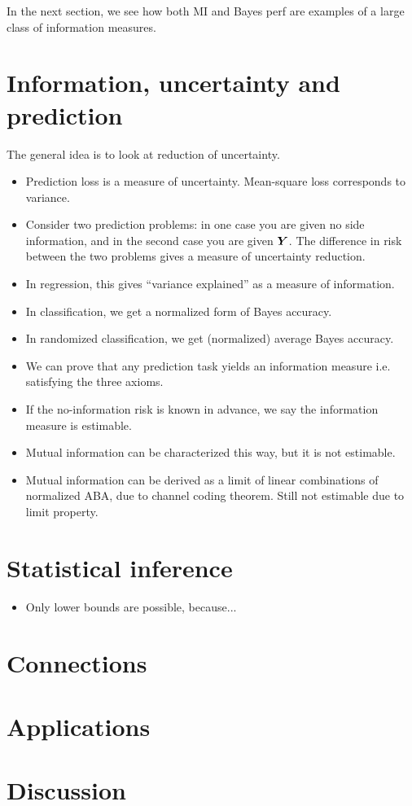 \documentclass[12pt]{article}
\begin{document}
In the next section, we see how both MI and Bayes perf are examples of
a large class of information measures.

\section{Information, uncertainty and prediction}\label{sec:gen_class}

The general idea is to look at reduction of uncertainty.

\begin{itemize}
\item 
Prediction loss is a measure of uncertainty.  Mean-square loss
corresponds to variance.
\item 
Consider two prediction problems: in one case you are given no side
information, and in the second case you are given $\boldsymbol{Y}$.  The
difference in risk between the two problems gives a measure of
uncertainty reduction.
\item
In regression, this gives ``variance explained'' as a measure of
information.
\item
In classification, we get a normalized form of Bayes accuracy.
\item
In randomized classification, we get (normalized) average Bayes accuracy.
\item
We can prove that any prediction task yields an information measure
i.e. satisfying the three axioms.
\item
If the no-information risk is known in advance, we say the information
measure is estimable.
\item
Mutual information can be characterized this way, but it is not estimable.
\item
Mutual information can be derived as a limit of linear combinations of
normalized ABA, due to channel coding theorem.  Still not estimable
due to limit property.
\end{itemize}

\section{Statistical inference}\label{sec:inference}

\begin{itemize}
\item Only lower bounds are possible, because...
\end{itemize}

\section{Connections}\label{sec:connections}

\section{Applications}\label{sec:applications}

\section{Discussion}\label{sec:discussion}
\end{document}

